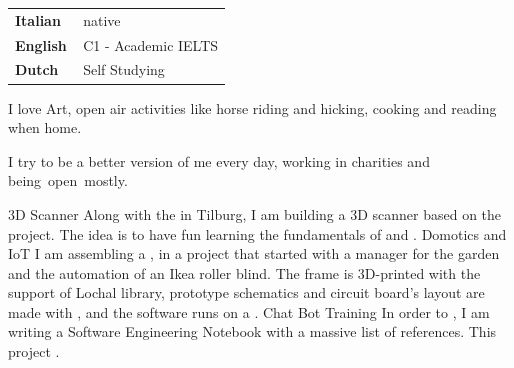 \documentclass[9pt]{developercv} %
\newcommand{\myHilight}[2]{\tcbtp{\textit{\color{#1}{#2}}}}
\begin{document}
\begin{minipage}[t]{0.3\textwidth}
	\vspace{-\baselineskip} %

    
	\begin{tabular}{l l}
    \textbf{Italian} \quad \quad & \,native \\
	\textbf{English     } & \,C1 - Academic IELTS\\
    \textbf{Dutch} & \,Self Studying

    \end{tabular}
\end{minipage}
\hfill
\begin{minipage}[t]{0.3\textwidth}
	\vspace{-\baselineskip} %
    
    
	I love Art, open air activities like horse riding and hicking, cooking and reading when home.
\end{minipage}
\hfill
\begin{minipage}[t]{0.3\textwidth}
	\vspace{-\baselineskip} %
	
    I try to be a better version of me \linebreak every day, working in charities and \linebreak \mbox{being open mostly.} \linebreak
\end{minipage}

\begin{entrylist}
    \entry{}
    {3D Scanner}
    {}
    {Along with the \myHilight{textcolor}{Open Source Lab at Lochal Library} in Tilburg, 
    I am building a 3D scanner based on the \myHilight{textcolor}{OpenScan} project.
    The idea is to have fun learning the fundamentals of \myHilight{textcolor}{stereophotogrammetry}
    and \myHilight{textcolor}{3D scanning and printing}.}
    \entry{}
    {Domotics and IoT}
    {}
    {I am assembling a \myHilight{textcolor}{modular home assitant},
    in a project that started with a manager for the garden and the automation of an Ikea roller blind.
    \newline
    The frame is 3D-printed with the support of Lochal library,  
    prototype schematics and circuit board's layout are made with \myHilight{textcolor}{KiKad}, 
    and the software runs on a \myHilight{textcolor}{Rasbperry Pi 4}.}   
    \entry{}
    {Chat Bot Training}
    {}
    {In order to \myHilight{textcolor}{train a chat bot on a specific domain}, 
    I am writing a Software Engineering Notebook with a massive list of references.
    \newline
    This project \myHilight{textcolor}{ purpose is mostly educative}.}
\end{entrylist}
\end{document}
